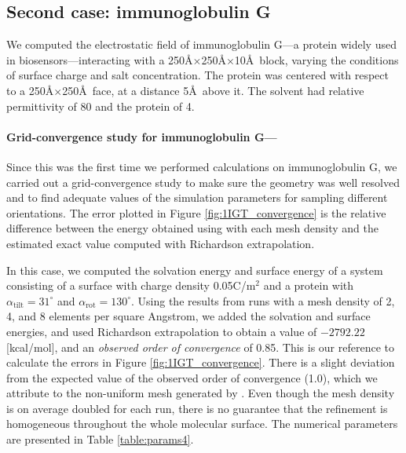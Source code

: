 \subsection{Second case: immunoglobulin G} \label{sec:IGT}


We computed the electrostatic field of immunoglobulin G---a protein widely used in biosensors---interacting with a 250\AA$\times$250\AA$\times$10\AA\ block, varying the conditions of surface charge and salt concentration. The protein was centered with respect to a  250\AA$\times$250\AA\ face, at a distance 5\AA\ above it. The solvent had relative permittivity of 80 and the protein of 4.

\medskip

 \paragraph*{Grid-convergence study for immunoglobulin G---}

Since this was the first time we performed calculations on immunoglobulin G, we carried out a grid-convergence study to make sure the geometry was well resolved and to find adequate values of the simulation parameters for sampling different orientations. The error plotted in Figure \ref{fig:1IGT_convergence} is the relative difference between the energy obtained using \pygbe with each mesh density and the estimated exact value computed with Richardson extrapolation.

In this case, we computed the solvation energy and surface energy of a system consisting of a surface with charge density 0.05C/m$^2$ and a protein with $\alpha_{\text{tilt}} = 31^{\circ}$ and $\alpha_{\text{rot}} = 130^{\circ}$. Using the results from runs with a mesh density of 2, 4, and 8 elements per square Angstrom, we added the solvation and surface energies, and used Richardson extrapolation to obtain a value of $-2792.22$[kcal/mol], and an \emph{observed order of convergence} of 0.85. This is our reference to calculate the errors in Figure \ref{fig:1IGT_convergence}. There is a slight deviation from the expected value of the observed order of convergence (1.0), which we attribute to the non-uniform mesh generated by \msms. Even though the mesh density is on average doubled for each run, there is no guarantee that the refinement is homogeneous throughout the whole molecular surface. The numerical parameters are presented in Table \ref{table:params4}.

